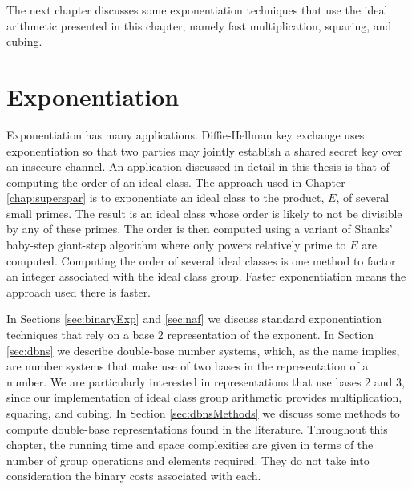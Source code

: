 \documentclass{ucalgthes1}
\theoremstyle{definition}
\begin{document}
The next chapter discusses some exponentiation techniques that use the ideal arithmetic presented in this chapter, namely fast multiplication, squaring, and cubing.


\chapter{Exponentiation}
\label{chap:exponentiation}

Exponentiation has many applications. Diffie-Hellman key exchange uses exponentiation so that two parties may jointly establish a shared secret key over an insecure channel.  An application discussed in detail in this thesis is that of computing the order of an ideal class.  The approach used in Chapter \ref{chap:superspar} is to exponentiate an ideal class to the product, $E$, of several small primes.  The result is an ideal class whose order is likely to not be divisible by any of these primes.  The order is then computed using a variant of Shanks' baby-step giant-step algorithm where only powers relatively prime to $E$ are computed.  Computing the order of several ideal classes is one method to factor an integer associated with the ideal class group.  Faster exponentiation means the approach used there is faster.

In Sections \ref{sec:binaryExp} and \ref{sec:naf} we discuss standard exponentiation techniques that rely on a base 2 representation of the exponent.  In Section \ref{sec:dbns} we describe double-base number systems, which, as the name implies, are number systems that make use of two bases in the representation of a number.  We are particularly interested in representations that use bases 2 and 3, since our implementation of ideal class group arithmetic provides multiplication, squaring, and cubing. In Section \ref{sec:dbnsMethods} we discuss some methods to compute double-base representations found in the literature.  Throughout this chapter, the running time and space complexities are given in terms of the number of group operations and elements required. They do not take into consideration the binary costs associated with each.
\end{document}
